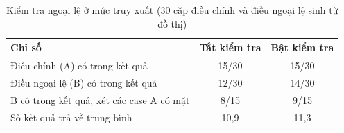 \begin{table}[H]
\centering
\small
\caption{Kiểm tra ngoại lệ ở mức truy xuất (30 cặp điều chính và điều ngoại lệ sinh từ đồ thị)}
\label{tab:ngoaile}
\begin{tabular}{|L{7.2cm}|c|c|}
\hline
\textbf{Chỉ số} & \textbf{Tắt kiểm tra} & \textbf{Bật kiểm tra} \\ \hline
Điều chính (A) có trong kết quả & 15/30 & 15/30 \\ \hline
Điều ngoại lệ (B) có trong kết quả & 12/30 & 14/30 \\ \hline
B có trong kết quả, xét các case A có mặt & 8/15 & 9/15 \\ \hline
Số kết quả trả về trung bình & 10{,}9 & 11{,}3 \\ \hline
\end{tabular}
\end{table}
